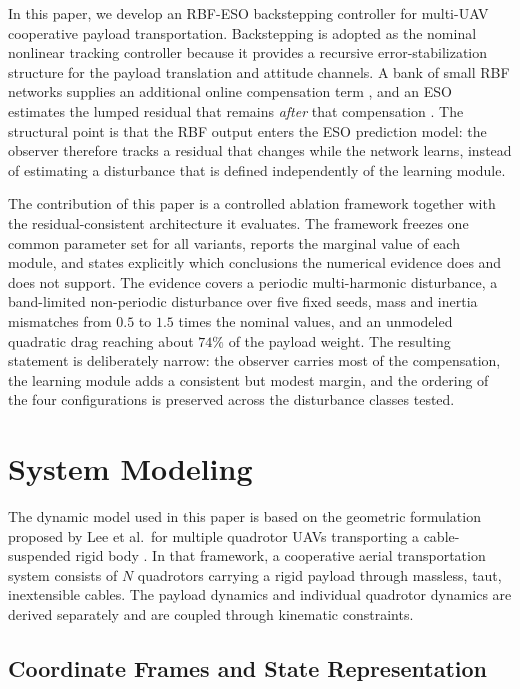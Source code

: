 \documentclass[Review,sageh,times]{sagej}
\begin{document}
In this paper, we develop an RBF-ESO backstepping controller for
multi-UAV cooperative payload transportation. Backstepping is adopted
as the nominal nonlinear tracking controller because it provides a recursive
error-stabilization structure for the payload translation and attitude
channels. A bank of small RBF networks supplies an additional online
compensation term \citep{broomhead1988,park1991,shen2021}, and an ESO
estimates the lumped residual that remains \emph{after} that compensation
\citep{han2009,madonski2015,gu2022}. The structural point is that the RBF
output enters the ESO prediction model: the observer therefore tracks a
residual that changes while the network learns, instead of estimating a
disturbance that is defined independently of the learning module.

The contribution of this paper is a controlled ablation framework
together with the residual-consistent architecture it evaluates. The
framework freezes one common parameter set for all variants, reports the
marginal value of each module, and states explicitly which conclusions
the numerical evidence does and does not support. The evidence covers a
periodic multi-harmonic disturbance, a band-limited non-periodic
disturbance over five fixed seeds, mass and inertia mismatches from
$0.5$ to $1.5$ times the nominal values, and an unmodeled quadratic drag
reaching about $74\%$ of the payload weight. The resulting statement is
deliberately narrow: the observer carries most of the compensation, the
learning module adds a consistent but modest margin, and the ordering of
the four configurations is preserved across the disturbance classes tested.

\section*{System Modeling}

The dynamic model used in this paper is based on the geometric
formulation proposed by Lee et al.\ for multiple quadrotor UAVs
transporting a cable-suspended rigid body \citep{lee2013a,lee2013c}. In that
framework, a cooperative aerial transportation system consists of $N$
quadrotors carrying a rigid payload through massless, taut, inextensible
cables. The payload dynamics and individual quadrotor dynamics are
derived separately and are coupled through kinematic constraints.

\subsection*{Coordinate Frames and State Representation}
\end{document}
